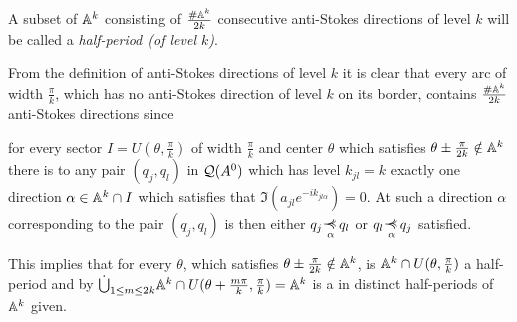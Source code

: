 \begin{defn}
  A subset of $\mathbb{A}^k$ consisting of $\frac{\#\mathbb{A}^k}{2k}$ consecutive anti-Stokes
  directions of level $k$ will be called a \emph{half-period (of level $k$)}.
\end{defn}
From the definition of anti-Stokes directions of level $k$ it is clear that
every arc of width $\frac{\pi}{k}$, which has no anti-Stokes direction of level
$k$ on its border, contains $\frac{\#\mathbb{A}^k}{2k}$ anti-Stokes directions
since
\begin{einr}
  for every sector $I=U(\theta,\frac{\pi}{k})$ of width $\frac{\pi}{k}$ and
  center $\theta$ which satisfies $\theta\pm\frac{\pi}{2k}\notin\mathbb{A}^k$
  there is to any pair $(q_j,q_l)$ in $\mathcal{Q}(A^0)$ which has level $k_{jl}=k$
  exactly one direction $\alpha\in \mathbb{A}^k\cap I$ which satisfies that
  $\Im(a_{jl}e^{-ik_{jl\alpha}})=0$.
  At such a direction $\alpha$ corresponding to the pair $(q_j,q_l)$ is then
  either $q_j\myrel{\alpha}q_l$ or $q_l\myrel{\alpha}q_j$ satisfied.
\end{einr}
This implies that for every $\theta$, which satisfies
$\theta\pm\frac{\pi}{2k}\notin\mathbb{A}^k$, is $\mathbb{A}^k\cap U(\theta,\frac{\pi}{k})$
a half-period and by
$\dot\bigcup_{1\leq m\leq 2k}\mathbb{A}^k\cap U(\theta+\frac{m\pi}{k},\frac{\pi}{k})
=\mathbb{A}^k$ is a  in
distinct half-periods of $\mathbb{A}^k$ given.

